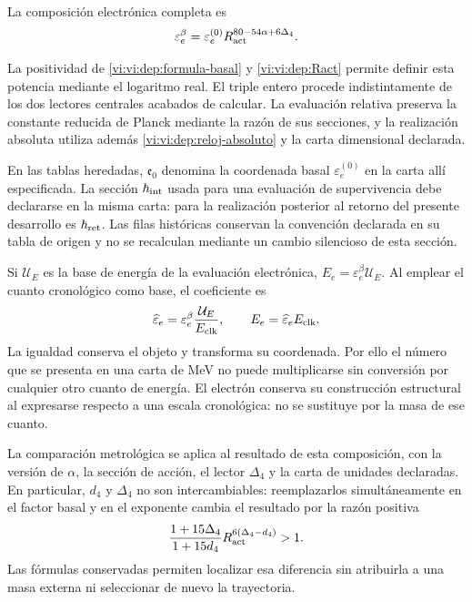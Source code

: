 \begin{definition}
La composición electrónica completa es
\begin{equation}
 \varepsilon_e^\beta
  =\varepsilon_e^{(0)}
      R_{\rm act}^{80-54\alpha+6\Delta_4}.
 \label{vi:vi:dep:electron-beta}
\end{equation}
\end{definition}
La positividad de \eqref{vi:vi:dep:formula-basal} y
\eqref{vi:vi:dep:Ract} permite definir esta potencia mediante el
logaritmo real. El triple entero procede indistintamente de los dos
lectores centrales acabados de calcular. La evaluación relativa
preserva la constante reducida de Planck mediante la razón de sus
secciones, y la realización absoluta utiliza además
\eqref{vi:vi:dep:reloj-absoluto} y la carta dimensional declarada.

En las tablas heredadas, \(\mathfrak e_0\) denomina la
coordenada basal \(\varepsilon_e^{(0)}\) en la carta allí
especificada. La sección \(\hbar_{\rm int}\) usada para una
evaluación de supervivencia debe declararse en la misma carta:
para la realización posterior al retorno del presente desarrollo
es \(\hbar_{\rm ret}\). Las filas históricas conservan la
convención declarada en su tabla de origen y no se recalculan mediante un
cambio silencioso de esta sección.

Si \(\mathcal U_E\) es la base de energía de la evaluación
electrónica, \(E_e=\varepsilon_e^\beta\mathcal U_E\). Al emplear
el cuanto cronológico como base, el coeficiente es
\[
 \widehat\varepsilon_e
   =\varepsilon_e^\beta\frac{\mathcal U_E}{E_{\rm clk}},
 \qquad E_e=\widehat\varepsilon_e E_{\rm clk}.
\]
La igualdad conserva el objeto y transforma su coordenada. Por ello
el número que se presenta en una carta de MeV no puede multiplicarse
sin conversión por cualquier otro cuanto de energía. El electrón
conserva su construcción estructural al expresarse respecto a una
escala cronológica: no se sustituye por la masa de ese cuanto.

La comparación metrológica se aplica al resultado de esta composición,
con la versión de \(\alpha\), la sección de acción, el lector
\(\Delta_4\) y la carta de unidades declaradas. En particular,
\(d_4\) y \(\Delta_4\) no son intercambiables: reemplazarlos
simultáneamente en el factor basal y en el exponente cambia el
resultado por la razón positiva
\[
 \frac{1+15\Delta_4}{1+15d_4}
 R_{\rm act}^{6(\Delta_4-d_4)}>1.
\]
Las fórmulas conservadas permiten localizar esa diferencia sin
atribuirla a una masa externa ni seleccionar de nuevo la trayectoria.
